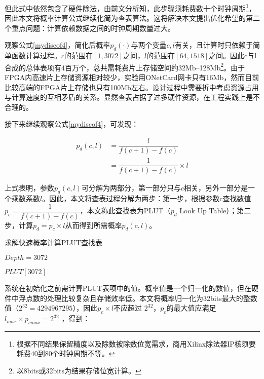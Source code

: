 但此式中依然包含了硬件除法，由前文分析知，此步骤须耗费数十个时钟周期\footnote{根据不同结果保留精度以及除数被除数位宽需求，商用Xilinx除法器IP核须要耗费40到80个时钟周期不等。}，因此本文将概率计算公式继续化简为查表算法。这将解决本文提出优化希望的第二个重点问题：计算依赖数据之间的时钟周期数量过大。

观察公式\ref{mydiscof4}，简化后概率$ p_d(\cdot) $与两个变量$ c,l $有关，且计算时只依赖于简单函数计算过程。$ c $的范围在$ [1,3072] $之间，$ l $的范围在$ [64,1518] $之间。因此c与l合成的总体表项有4百万个，总共需耗费片上存储空间约32Mb--128Mb\footnote{以8bits或32bits为结果存储位宽计算。}。由于FPGA内高速片上存储资源相对较少，实验用ONetCard网卡只有16Mb，然而目前比较高端的FPGA片上存储也只有100Mb左右。设计过程中需要折中考虑资源占用与计算速度的互相矛盾的关系。显然查表占据了过多硬件资源，在工程实践上是不合理的。

接下来继续观察公式\ref{mydiscof4}，可发现：

\begin{align}\label{mydiscof5}
p_d(c,l) &= \dfrac{l}{f(c+1)-f(c)}   \nonumber \\
&= \dfrac{1}{f(c+1)-f(c)} \times l 
\end{align}

上式表明，参数$ p_d(c,l) $可分解为两部分，第一部分只与$ c $相关，另外一部分是一个乘数系数$l$。因此，本文将查表过程分解为两步：第一步，根据参数c查找数值$ p_c= \dfrac{1}{f(c+1)-f(c)} $，本文称此查找表为PLUT（$p_d$ Look Up Table）；第二步，计算$ p_d = p_c \times l $从而得到所需概率$ p_d(c,l) $。

\begin{algorithm}[ht]
	\caption{求解快速概率计算PLUT查找表  \label{mydiscoa3}}
	\IncMargin{2em}
	\DontPrintSemicolon
	$Depth = 3072 $ 
	
	$ PLUT[3072] $
	
\end{algorithm}



系统在初始化之前需计算PLUT表项中的值。概率值是一个归一化的数值，但在硬件中浮点数的处理比较复杂且存储效率低。本文将概率归一化为32bits最大的整数值（$2^{32}=4294967295$），因此$ p_c \times l  $不应超过 $ 2^{32} $，$ p_c $的最大值应满足$ l_{max} \times p_{cmax} = 2^{32 } $ ，得到：

